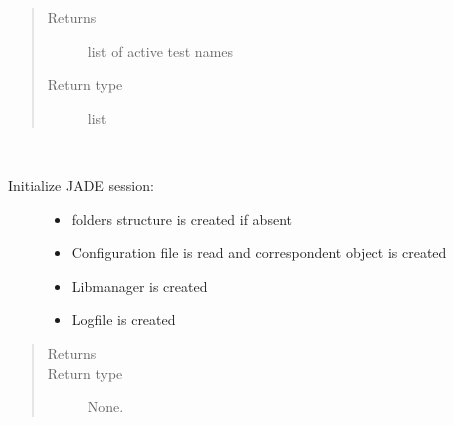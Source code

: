 \documentclass[letterpaper,10pt,english]{sphinxmanual}
\begin{document}
\begin{fulllineitems}
\begin{fulllineitems}
\begin{quote}
\begin{description}
\begin{itemize}
\end{itemize}

\item[{Returns}] \leavevmode
\sphinxAtStartPar
{} \textendash{} list of active test names

\item[{Return type}] \leavevmode
\sphinxAtStartPar
list

\end{description}\end{quote}

\end{fulllineitems}


\begin{fulllineitems}
\label{\detokenize{api/initobjects:main.Session.initialize}}~\begin{description}
\item[{Initialize JADE session:}] \leavevmode\begin{itemize}
\item {} 
\sphinxAtStartPar
folders structure is created if absent

\item {} 
\sphinxAtStartPar
Configuration file is read and correspondent object is created

\item {} 
\sphinxAtStartPar
Libmanager is created

\item {} 
\sphinxAtStartPar
Logfile is created

\end{itemize}

\end{description}
\begin{quote}\begin{description}
\item[{Returns}] \leavevmode
\sphinxAtStartPar


\item[{Return type}] \leavevmode
\sphinxAtStartPar
None.

\end{description}\end{quote}

\end{fulllineitems}



\end{fulllineitems}
\end{document}
